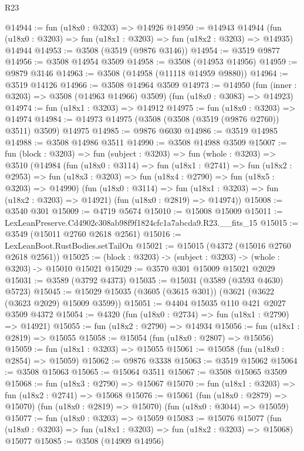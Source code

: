\begin{lexlean}{R23}
\begin{coremodule}
@14944 := fun (u18x0 : @3203) => @14926
@14950 := @14943
    @14944
    (fun (u18x0 : @3203) => fun (u18x1 : @3203) => fun (u18x2 : @3203) => @14935)
    @14944
@14953 := @3508 (@3519 (@9876 @3146))
@14954 := @3519 @9877
@14956 := @3508 @14954 @3509
@14958 := @3508 (@14953 @14956)
@14959 := @9879 @3146
@14963 := @3508 (@14958 (@11118 @14959 @9880))
@14964 := @3519 @14126
@14966 := @3508 @14964 @3509
@14973 := @14950
    (fun (inner : @3203) => @3508 (@14963 @14966) @3509)
    (fun (u18x0 : @3083) => @14923)
@14974 := fun (u18x1 : @3203) => @14912
@14975 := fun (u18x0 : @3203) => @14974
@14984 := @14973 @14975 (@3508 (@3508 (@3519 (@9876 @2760)) @3511) @3509) @14975
@14985 := @9876 @6030
@14986 := @3519 @14985
@14988 := @3508 @14986 @3511
@14990 := @3508 @14988 @3509
@15007 := fun (block : @3203) =>
  fun (subject : @3203) =>
  fun (whole : @3203) =>
  @3510
    (@14984
      (fun (u18x0 : @3114) =>
      fun (u18x1 : @2741) =>
      fun (u18x2 : @2953) =>
      fun (u18x3 : @3203) => fun (u18x4 : @2790) => fun (u18x5 : @3203) => @14990)
      (fun (u18x0 : @3114) => fun (u18x1 : @3203) => fun (u18x2 : @3203) => @14921)
      (fun (u18x0 : @2819) => @14974))
@15008 := @3540 @301
@15009 := @4719 @5674
@15010 := @15008 @15009
@15011 := LexLeanPreserve.Cd4902c308ab98f9f1824cfc1a7abcda9.R23.__fits_15
@15015 := @3549 (@15011 @2760 @2618 @2561)
@15016 := LexLeanBoot.RustBodies.setTailOn
@15021 := @15015 (@4372 (@15016 @2760 @2618 @2561))
@15025 := (block : @3203) -> (subject : @3203) -> (whole : @3203) -> @15010 @15021
@15029 := @3570 @301 @15009 @15021 @2029
@15031 := @3589 (@3792 @4373)
@15035 := @15031 (@3589 (@3593 @4630) @5723)
@15045 := @15029 @15035 (@3605 (@3615 @301)) (@3621 (@3622 (@3623 @2029) @15009 @3599))
@15051 := @4404 @15035 @110 @421 @2027 @3509 @4372
@15054 := @4320 (fun (u18x0 : @2734) => fun (u18x1 : @2790) => @14921)
@15055 := fun (u18x2 : @2790) => @14934
@15056 := fun (u18x1 : @2819) => @15055
@15058 := @15054 (fun (u18x0 : @2807) => @15056)
@15059 := fun (u18x1 : @3203) => @15055
@15061 := @15058 (fun (u18x0 : @2854) => @15059)
@15062 := @9876 @3338
@15063 := @3519 @15062
@15064 := @3508 @15063
@15065 := @15064 @3511
@15067 := @3508 @15065 @3509
@15068 := fun (u18x3 : @2790) => @15067
@15070 := fun (u18x1 : @3203) => fun (u18x2 : @2741) => @15068
@15076 := @15061
    (fun (u18x0 : @2879) => @15070)
    (fun (u18x0 : @2819) => @15070)
    (fun (u18x0 : @3044) => @15059)
@15077 := fun (u18x0 : @3203) => @15059
@15083 := @15076
    @15077
    (fun (u18x0 : @3203) => fun (u18x1 : @3203) => fun (u18x2 : @3203) => @15068)
    @15077
@15085 := @3508 (@14909 @14956)

\end{coremodule}
\end{lexlean}

